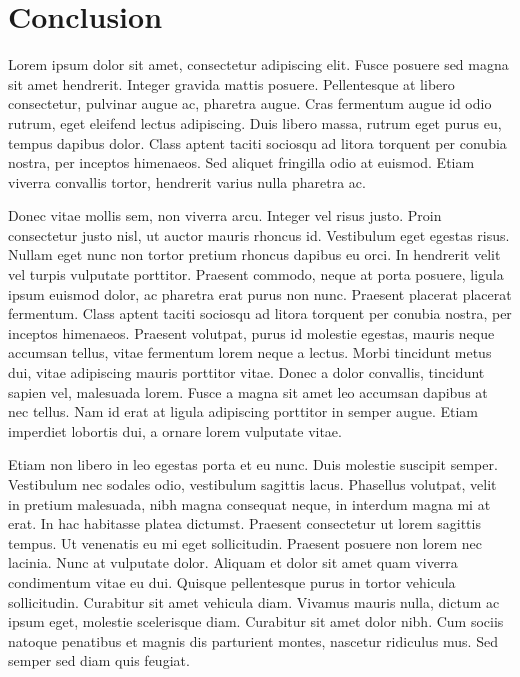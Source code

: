 \documentclass[double,12pt]{beavtex}
\begin{document}
\chapter{Conclusion}

Lorem ipsum dolor sit amet, consectetur adipiscing elit. Fusce posuere sed magna sit amet hendrerit. Integer gravida mattis posuere. Pellentesque at libero consectetur, pulvinar augue ac, pharetra augue. Cras fermentum augue id odio rutrum, eget eleifend lectus adipiscing. Duis libero massa, rutrum eget purus eu, tempus dapibus dolor. Class aptent taciti sociosqu ad litora torquent per conubia nostra, per inceptos himenaeos. Sed aliquet fringilla odio at euismod. Etiam viverra convallis tortor, hendrerit varius nulla pharetra ac. 

Donec vitae mollis sem, non viverra arcu. Integer vel risus justo. Proin consectetur justo nisl, ut auctor mauris rhoncus id. Vestibulum eget egestas risus. Nullam eget nunc non tortor pretium rhoncus dapibus eu orci. In hendrerit velit vel turpis vulputate porttitor. Praesent commodo, neque at porta posuere, ligula ipsum euismod dolor, ac pharetra erat purus non nunc. Praesent placerat placerat fermentum. Class aptent taciti sociosqu ad litora torquent per conubia nostra, per inceptos himenaeos. Praesent volutpat, purus id molestie egestas, mauris neque accumsan tellus, vitae fermentum lorem neque a lectus. Morbi tincidunt metus dui, vitae adipiscing mauris porttitor vitae. Donec a dolor convallis, tincidunt sapien vel, malesuada lorem. Fusce a magna sit amet leo accumsan dapibus at nec tellus. Nam id erat at ligula adipiscing porttitor in semper augue. Etiam imperdiet lobortis dui, a ornare lorem vulputate vitae. 

Etiam non libero in leo egestas porta et eu nunc. Duis molestie suscipit semper. Vestibulum nec sodales odio, vestibulum sagittis lacus. Phasellus volutpat, velit in pretium malesuada, nibh magna consequat neque, in interdum magna mi at erat. In hac habitasse platea dictumst. Praesent consectetur ut lorem sagittis tempus. Ut venenatis eu mi eget sollicitudin. Praesent posuere non lorem nec lacinia. Nunc at vulputate dolor. Aliquam et dolor sit amet quam viverra condimentum vitae eu dui. Quisque pellentesque purus in tortor vehicula sollicitudin. Curabitur sit amet vehicula diam. Vivamus mauris nulla, dictum ac ipsum eget, molestie scelerisque diam. Curabitur sit amet dolor nibh. Cum sociis natoque penatibus et magnis dis parturient montes, nascetur ridiculus mus. Sed semper sed diam quis feugiat. 
\end{document}
